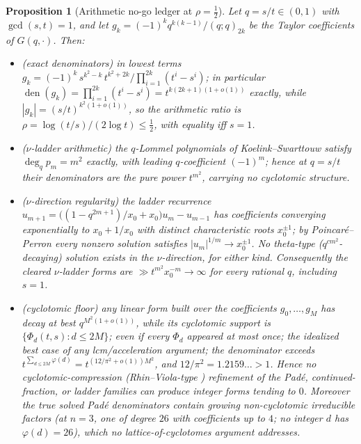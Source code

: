 \documentclass[11pt]{article}
\theoremstyle{plain}
\newtheorem{proposition}[theorem]{Proposition}
\theoremstyle{definition}
\theoremstyle{remark}
\begin{document}
\begin{proposition}[Arithmetic no-go ledger at $\rho=\tfrac12$]
\label{prop:nogo}
Let $q=s/t\in(0,1)$ with $\gcd(s,t)=1$, and let $g_k=(-1)^kq^{k(k-1)}/(q;q)_{2k}$ be the Taylor
coefficients of $G(q,\cdot)$. Then:
\begin{itemize}
\item[\textup{(i)}] \textup{(exact denominators)} in lowest terms
$g_k=(-1)^k\,s^{k^2-k}\,t^{k^2+2k}\big/\prod_{i=1}^{2k}(t^i-s^i)$; in particular
$\operatorname{den}(g_k)=\prod_{i=1}^{2k}(t^i-s^i)=t^{k(2k+1)(1+o(1))}$ exactly, while
$|g_k|=(s/t)^{k^2(1+o(1))}$, so the arithmetic ratio is
$\rho=\log(t/s)/(2\log t)\le\tfrac12$, with equality iff $s=1$.
\item[\textup{(ii)}] \textup{($\nu$-ladder arithmetic)} the $q$-Lommel polynomials of
Koelink--Swarttouw \cite{KoelinkSwarttouw1994} satisfy $\deg_qp_m=m^2$ exactly, with leading $q$-coefficient $(-1)^m$; hence at
$q=s/t$ their denominators are the pure power $t^{m^2}$, carrying no cyclotomic structure.
\item[\textup{(iii)}] \textup{($\nu$-direction regularity)} the ladder recurrence
$u_{m+1}=\bigl((1-q^{2m+1})/x_0+x_0\bigr)u_m-u_{m-1}$ has coefficients converging exponentially to
$x_0+1/x_0$ with distinct characteristic roots $x_0^{\pm1}$; by Poincar\'e--Perron
\cite{Poincare1885,Perron1909} every nonzero
solution satisfies $|u_m|^{1/m}\to x_0^{\pm1}$. No theta-type ($q^{cm^2}$-decaying) solution exists
in the $\nu$-direction, for either kind. Consequently the cleared $\nu$-ladder forms are
$\gg t^{m^2}x_0^{-m}\to\infty$ for every rational $q$, including $s=1$.
\item[\textup{(iv)}] \textup{(cyclotomic floor)} any linear form built over the coefficients
$g_0,\dots,g_M$ has decay at best $q^{M^2(1+o(1))}$, while its cyclotomic support is
$\{\Phi_d(t,s):d\le2M\}$; even if every $\Phi_d$ appeared at most \emph{once}; the idealized best
case of any lcm/acceleration argument; the denominator exceeds
$t^{\sum_{d\le2M}\varphi(d)}=t^{(12/\pi^2+o(1))M^2}$, and $12/\pi^2=1.2159\ldots>1$. Hence no
cyclotomic-compression (Rhin--Viola-type \cite{RhinViola2001}) refinement of the Pad\'e, continued-fraction, or ladder
families can produce integer forms tending to $0$. Moreover the true solved Pad\'e denominators
contain growing \emph{non-cyclotomic} irreducible factors (at $n=3$, one of degree $26$ with
coefficients up to $4$; no integer $d$ has $\varphi(d)=26$), which no lattice-of-cyclotomes argument
addresses.
\end{itemize}
\end{proposition}
\end{document}
